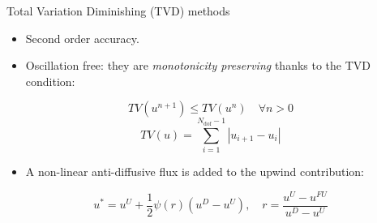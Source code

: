 \documentclass{beamer}
\begin{document}
\begin{frame}{Total Variation Diminishing (TVD) methods}
\begin{itemize}
	\item Second order accuracy.
	\item Oscillation free: they are \emph{monotonicity preserving} thanks to 
	the TVD condition:
\end{itemize}
\vspace{0.3cm}
\begin{equation*}
	TV(u^{n+1}) \leq TV(u^n) \quad \forall n>0
\end{equation*}
\begin{equation*}
	TV(u) = 
	\sum_{i=1}^{N_\text{dof}-1} |u_{i+1} - u_i|
\end{equation*}
\vspace{0.3cm}
\begin{itemize}
	\item A non-linear anti-diffusive flux is added to the upwind contribution:
\end{itemize}
\begin{equation*}
u^* = u^U + \frac{1}{2} \psi(r)(u^D - u^U), \quad r = \frac{u^U - u^{FU}}{u^D 
- u^U}
\end{equation*}
\end{frame}
\end{document}
